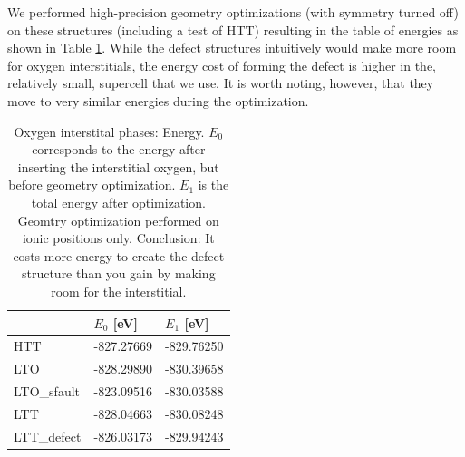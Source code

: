 We performed high-precision geometry optimizations (with symmetry turned off) on these structures (including a test of HTT) resulting in the table of energies as shown in Table \ref{tab:oint_en}. While the defect structures intuitively would make more room for oxygen interstitials, the energy cost of forming the defect is higher in the, relatively small, supercell that we use. It is worth noting, however, that they move to very similar energies during the optimization.


\begin{table}[b]
    \centering
    \begin{tabular}{@{}lll@{}}
    \toprule
     & $E_0$ [eV] & $E_1$ [eV]            \\ \midrule
    HTT                     & -827.27669             & -829.76250 \\
    LTO                     & -828.29890             & -830.39658 \\
    LTO\_sfault              & -823.09516             & -830.03588 \\
    LTT                     & -828.04663             & -830.08248 \\
    LTT\_defect              & -826.03173             & -829.94243 \\ \bottomrule
    \end{tabular}
    \caption[Oxygen interstital phases: Energy]{Oxygen interstital phases: Energy. $E_0$ corresponds to the energy after inserting the interstitial oxygen, but before geometry optimization. $E_1$ is the total energy after optimization. Geomtry optimization performed on ionic positions only. Conclusion: It costs more energy to create the defect structure than you gain by making room for the interstitial.}
    \label{tab:oint_en}
\end{table}

